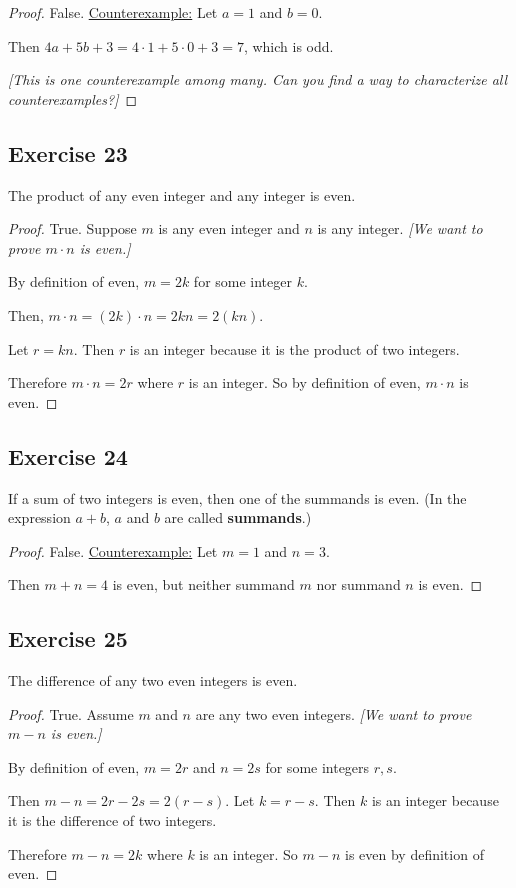 \documentclass[14pt]{extarticle}
\begin{document}
\begin{proof}
    False. \underline{Counterexample:} Let $a = 1$ and $b = 0$.

    Then $4a + 5b + 3 = 4\cdot 1 + 5\cdot 0 + 3 = 7$, which is odd.

        {\it [This is one counterexample among many. Can you find a way to characterize all counterexamples?]}
\end{proof}

\subsection{Exercise 23}
The product of any even integer and any integer is even.

\begin{proof}
    True. Suppose $m$ is any even integer and $n$ is any integer. {\it [We want to prove $m \cdot n$ is even.]}

    By definition of even, $m = 2k$ for some integer $k$.

    Then, $m \cdot n = (2k) \cdot n = 2kn = 2(kn)$.

    Let $r = kn$. Then $r$ is an integer because it is the product of two integers.

    Therefore $m\cdot n = 2r$ where $r$ is an integer. So by definition of even, $m \cdot n$ is even.
\end{proof}

\subsection{Exercise 24}
If a sum of two integers is even, then one of the summands is even. (In the expression $a + b$, $a$ and $b$ are called {\bf summands}.)

\begin{proof}
    False. \underline{Counterexample:} Let $m = 1$ and $n = 3$.

    Then $m + n = 4$ is even, but neither summand $m$ nor summand $n$ is even.
\end{proof}

\subsection{Exercise 25}
The difference of any two even integers is even.

\begin{proof}
    True. Assume $m$ and $n$ are any two even integers. {\it [We want to prove $m-n$ is even.]}

    By definition of even, $m = 2r$ and $n = 2s$ for some integers $r, s$.

    Then $m - n = 2r - 2s = 2(r-s)$. Let $k = r-s$. Then $k$ is an integer because it is the difference of two integers.

    Therefore $m - n = 2k$ where $k$ is an integer. So $m-n$ is even by definition of even.
\end{proof}
\end{document}
